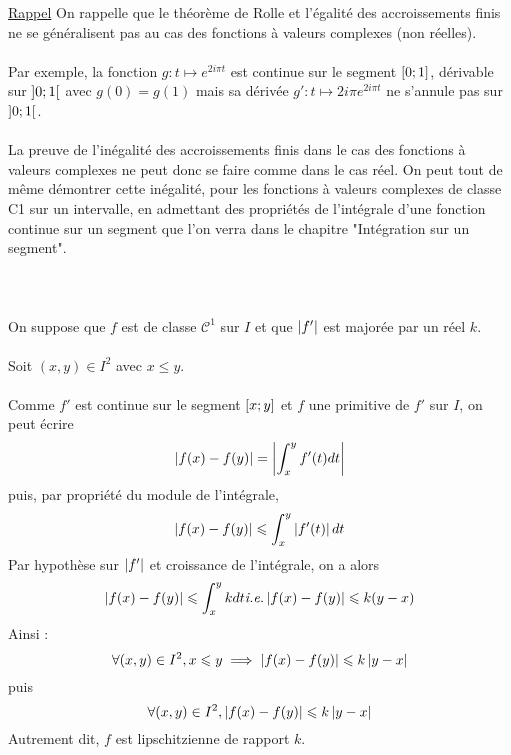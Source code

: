 \begin{dem}
    \underline{Rappel} On rappelle que le théorème de Rolle et l’égalité des accroissements finis ne se généralisent pas au cas des
    fonctions à valeurs complexes (non réelles).\\~\\
    Par exemple, la fonction \(g : t \mapsto e^{2i\pi t}\) est continue sur le segment \(\left[0;1\right]\), dérivable sur \(\left]0;1\right[\) avec \(g(0) = g(1)\) mais sa dérivée \(g' : t \mapsto 2i\pi e^{2i\pi t}\) ne s’annule pas sur \(\left]0;1\right[\).\\~\\
    La preuve de l’inégalité des accroissements finis dans le cas des fonctions à valeurs complexes ne peut donc se faire comme dans le cas réel. On peut tout de même démontrer cette inégalité, pour les fonctions à valeurs complexes de classe C1 sur un intervalle, en admettant des propriétés de l’intégrale d’une fonction continue sur un segment que l’on verra dans le chapitre "Intégration sur un segment".\\~\\~\\~\\
    On suppose que \(f\) est de classe  \(\mathcal{C}^1\) sur \(I\) et que \(\left\lvert f '\right\rvert\) est majorée par un réel \(k\).\\~\\
    Soit \((x, y) \in I^2\) avec \(x \leq y\).\\~\\
    Comme \(f '\) est continue sur le segment \(\left[x;y\right]\) et \(f\) une primitive de \(f '\) sur \(I\), on peut écrire
    \[\left\lvert f(x) - f(y)\right\rvert = \left\lvert\int_x^y f'(t)dt\right\rvert\]
    puis, par propriété du module de l’intégrale,
    \[\left\lvert f (x) - f (y)\right\rvert \leqslant \int^y_x \left\lvert f '(t)\right\rvert dt\]
    Par hypothèse sur \(\left\lvert f '\right\rvert\) et croissance de l’intégrale, on a alors
    \[\left\lvert f (x) - f (y)\right\rvert \leqslant \int^y_x k dt  \textit{i.e.}  \left\lvert f (x) - f (y)\right\rvert \leqslant k (y - x)\] 
    Ainsi :
    \[\forall (x, y) \in I^2, x \leqslant y \implies \left\lvert f (x) - f (y)\right\rvert \leqslant k \left\lvert y - x\right\rvert\]
    puis
    \[\forall (x, y) \in I^2, \left\lvert f (x) - f (y)\right\rvert \leqslant k \left\lvert y - x\right\rvert\] 
    Autrement dit, \(f\) est lipschitzienne de rapport \(k\).
\end{dem}
